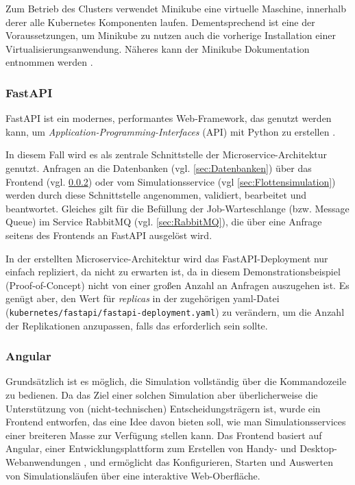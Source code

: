 \documentclass[11pt,a4paper]{article}
\begin{document}
Zum Betrieb des Clusters verwendet Minikube eine virtuelle Maschine, innerhalb derer
alle Kubernetes Komponenten laufen. Dementsprechend ist eine der Voraussetzungen,
um Minikube zu nutzen auch die vorherige Installation einer Virtualisierungsanwendung.
Näheres kann der Minikube Dokumentation entnommen werden \cite{minikube}.

\subsubsection{FastAPI}
\label{sec:FastAPI}
FastAPI ist ein modernes, performantes Web-Framework, das genutzt werden kann, um \emph{Application-Programming-Interfaces} (API)
mit Python zu erstellen \cite{Ramirez_FastAPI}.

In diesem Fall wird es als zentrale Schnittstelle der Microservice-Architektur genutzt.
Anfragen an die Datenbanken (vgl. \ref{sec:Datenbanken})
über das Frontend (vgl. \ref{sec:Angular}) oder vom Simulationsservice (vgl \ref{sec:Flottensimulation})
werden durch diese Schnittstelle angenommen, validiert, bearbeitet und beantwortet.
Gleiches gilt für die Befüllung der Job-Warteschlange (bzw. Message Queue) im Service
RabbitMQ (vgl. \ref{sec:RabbitMQ}), die über eine Anfrage seitens des Frontends an
FastAPI ausgelöst wird.

In der erstellten Microservice-Architektur wird das FastAPI-Deployment nur einfach repliziert,
da nicht zu erwarten ist, da in diesem Demonstrationsbeispiel (Proof-of-Concept) nicht von einer
großen Anzahl an Anfragen auszugehen ist. Es genügt aber, den Wert für \emph{replicas} in der zugehörigen
yaml-Datei (\lstinline|kubernetes/fastapi/fastapi-deployment.yaml|) zu verändern, um die Anzahl der Replikationen anzupassen, 
falls das erforderlich sein sollte.

\subsubsection{Angular}
\label{sec:Angular}
Grundsätzlich ist es möglich, die Simulation vollständig über die Kommandozeile zu bedienen.
Da das Ziel einer solchen Simulation aber überlicherweise die Unterstützung von (nicht-technischen) 
Entscheidungsträgern ist, wurde ein Frontend entworfen, das eine Idee davon bieten soll, wie man Simulationsservices
einer breiteren Masse zur Verfügung stellen kann. Das Frontend basiert auf Angular,
einer Entwicklungsplattform zum Erstellen von Handy- und Desktop-Webanwendungen \cite{jain2014angularjs},
und ermöglicht das Konfigurieren, Starten und Auswerten von Simulationsläufen über eine interaktive Web-Oberfläche.
\end{document}
